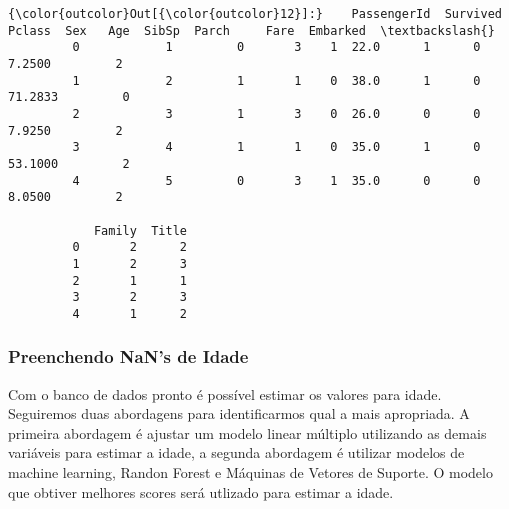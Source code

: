 \documentclass[11pt]{article}
\begin{document}
\begin{Verbatim}[commandchars=\\\{\}]
{\color{outcolor}Out[{\color{outcolor}12}]:}    PassengerId  Survived  Pclass  Sex   Age  SibSp  Parch     Fare  Embarked  \textbackslash{}
         0            1         0       3    1  22.0      1      0   7.2500         2   
         1            2         1       1    0  38.0      1      0  71.2833         0   
         2            3         1       3    0  26.0      0      0   7.9250         2   
         3            4         1       1    0  35.0      1      0  53.1000         2   
         4            5         0       3    1  35.0      0      0   8.0500         2   
         
            Family  Title  
         0       2      2  
         1       2      3  
         2       1      1  
         3       2      3  
         4       1      2  
\end{Verbatim}
            
    \subsubsection{Preenchendo NaN's de
Idade}\label{preenchendo-nans-de-idade}

    Com o banco de dados pronto é possível estimar os valores para idade.
Seguiremos duas abordagens para identificarmos qual a mais apropriada. A
primeira abordagem é ajustar um modelo linear múltiplo utilizando as
demais variáveis para estimar a idade, a segunda abordagem é utilizar
modelos de machine learning, Randon Forest e Máquinas de Vetores de
Suporte. O modelo que obtiver melhores scores será utlizado para estimar
a idade.
\end{document}
